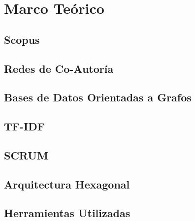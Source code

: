 \section{Marco Teórico}
\label{chapter01-section03:marcoTeorico}

\subsection{Scopus}
\label{chapter01-section03:Scopus}


\subsection{Redes de Co-Autoría}
\label{chapter01-section03:Redes de Co-Autoria}


\subsection{Bases de Datos Orientadas a Grafos}
\label{Chapter01-section3:Bases de datos orientadas a grados}


\subsection{TF-IDF}
\label{Chapter01-section3:TD-IDF}


\subsection{SCRUM}
\label{Chapter01-section3:SCRUM}



\subsection{Arquitectura Hexagonal}
\label{Chapter01-section3:Arquitectura Hexagonal}


\subsection{Herramientas Utilizadas}
\label{Chapter01-section3:Herramientas utilizadas}
